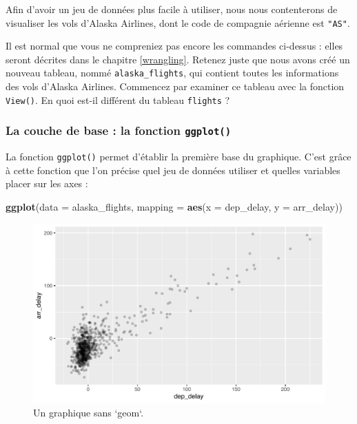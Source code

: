 \documentclass[a4paperpaper,]{article}
\newenvironment{Shaded}{\begin{snugshade}}{\end{snugshade}}
\newcommand{\DataTypeTok}[1]{\textcolor[rgb]{0.00,0.34,0.68}{#1}}
\newcommand{\KeywordTok}[1]{\textcolor[rgb]{0.12,0.11,0.11}{\textbf{#1}}}
\newcommand{\NormalTok}[1]{\textcolor[rgb]{0.12,0.11,0.11}{#1}}
\newcommand{\OperatorTok}[1]{\textcolor[rgb]{0.12,0.11,0.11}{#1}}
\newcommand{\StringTok}[1]{\textcolor[rgb]{0.75,0.01,0.01}{#1}}
\begin{document}
Afin d'avoir un jeu de données plus facile à utiliser, nous nous contenterons de visualiser les vols d'Alaska Airlines, dont le code de compagnie aérienne est \texttt{"AS"}.

\begin{Shaded}
\end{Shaded}

Il est normal que vous ne compreniez pas encore les commandes ci-dessus : elles seront décrites dans le chapitre \ref{wrangling}. Retenez juste que nous avons créé un nouveau tableau, nommé \texttt{alaska\_flights}, qui contient toutes les informations des vols d'Alaska Airlines. Commencez par examiner ce tableau avec la fonction \texttt{View()}. En quoi est-il différent du tableau \texttt{flights} ?

\hypertarget{la-couche-de-base-la-fonction-ggplot}{%
\subsubsection{\texorpdfstring{La couche de base : la fonction \texttt{ggplot()}}{La couche de base : la fonction ggplot()}}\label{la-couche-de-base-la-fonction-ggplot}}

La fonction \texttt{ggplot()} permet d'établir la première base du graphique. C'est grâce à cette fonction que l'on précise quel jeu de données utiliser et quelles variables placer sur les axes :

\begin{Shaded}
\begin{Highlighting}[]
\KeywordTok{ggplot}\NormalTok{(}\DataTypeTok{data =}\NormalTok{ alaska_flights, }\DataTypeTok{mapping =} \KeywordTok{aes}\NormalTok{(}\DataTypeTok{x =}\NormalTok{ dep_delay, }\DataTypeTok{y =}\NormalTok{ arr_delay))}
\end{Highlighting}
\end{Shaded}

\begin{figure}[htpb]

{\centering \includegraphics[width=0.9\linewidth]{figure/unnamed-chunk-40-1} 

}

\caption{Un graphique sans `geom`.}\label{fig:unnamed-chunk-40}
\end{figure}
\end{document}
